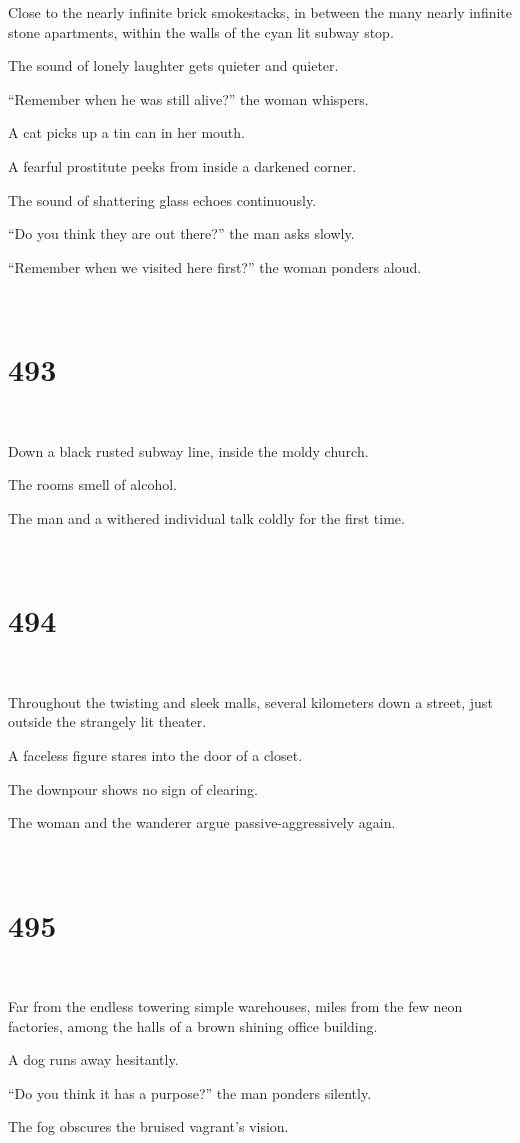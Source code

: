 \documentclass{report}
\begin{document}
Close to the nearly infinite brick smokestacks, in between the many nearly infinite stone apartments, within the walls of the cyan lit subway stop.

The sound of lonely laughter gets quieter and quieter.

``Remember when he was still alive?'' the woman whispers.

A cat picks up a tin can in her mouth.

A fearful prostitute peeks from inside a darkened corner.

The sound of shattering glass echoes continuously.

``Do you think they are out there?'' the man asks slowly.

``Remember when we visited here first?'' the woman ponders aloud.

~
\chapter*{493}
~

Down a black rusted subway line, inside the moldy church.

The rooms smell of alcohol.

The man and a withered individual talk coldly for the first time.

~
\chapter*{494}
~

Throughout the twisting and sleek malls, several kilometers down a street, just outside the strangely lit theater.

A faceless figure stares into the door of a closet.

The downpour shows no sign of clearing.

The woman and the wanderer argue passive-aggressively again.

~
\chapter*{495}
~

Far from the endless towering simple warehouses, miles from the few neon factories, among the halls of a brown shining office building.

A dog runs away hesitantly.

``Do you think it has a purpose?'' the man ponders silently.

The fog obscures the bruised vagrant's vision.
\end{document}
